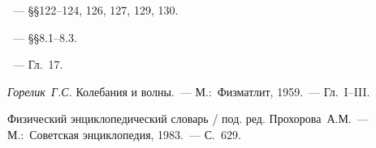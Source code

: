 

\begin{lab:literature}
	\item \SivuhinIII~--- \S\S122--124, 126, 127, 129, 130.
	\item \KingLokOlh~--- \S\S8.1--8.3.
	\item \Kirichenko~--- Гл.~17.
	\item \textit{Горелик~Г.С.} Колебания и волны.~--- М.:~Физматлит,
1959.~--- Гл.~I--III.
	\item Физический энциклопедический словарь / под. ред. Прохорова~А.М.~--- 
    М.:~Советская энциклопедия, 1983.~--- С.~629.
\end{lab:literature}

